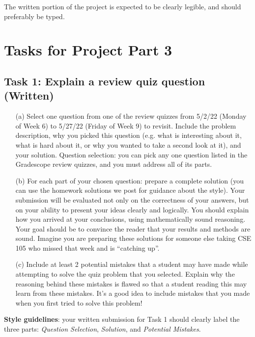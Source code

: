 \documentclass[12pt, oneside]{article}
\begin{document}
The written portion of the project is expected to be clearly legible, and should preferably be typed.

 \newpage
 \section*{Tasks for Project Part 3}

 \subsection*{Task 1: Explain a review quiz question (Written)}
	
	\begin{enumerate}
		\item[(a)] Select one question from one of the review quizzes from 5/2/22 (Monday of Week 6) to 5/27/22  (Friday of Week 9) to revisit.
		Include the problem description, why you picked this question (e.g. what is interesting about it, what is hard about it, 
		or why you wanted to take a second look at it), and your solution. Question selection: 
		you can pick any one question listed in the Gradescope review quizzes, and you must address 
		all  of its parts. 
 		\item[(b)] For each part of your chosen question: prepare a complete solution 
		 (you can use the homework solutions we post for guidance about the style). 
		 Your submission will be evaluated not only on the correctness of your answers, 
		 but on your ability to present your ideas clearly and logically. You should explain how you arrived at your conclusions, 
		 using mathematically sound reasoning. Your goal should be to convince the reader that your results and 
		 methods are sound. Imagine you are preparing these solutions for someone else taking 
		 CSE 105 who missed that week and is “catching up”.
 
 		\item[(c)] Include at least 2 potential mistakes that a student may have made while attempting to solve the quiz 
		 problem that you selected. Explain why the reasoning behind these mistakes is flawed so that 
		 a student reading this may learn from these mistakes. It's a good idea to include mistakes that you made 
		 when you first tried to solve this problem!	
	\end{enumerate}
	
	{\bf Style guidelines}: your written submission for Task 1 should clearly label the three parts:
	{\it Question Selection}, {\it Solution},  and {\it Potential Mistakes}.
\end{document}
